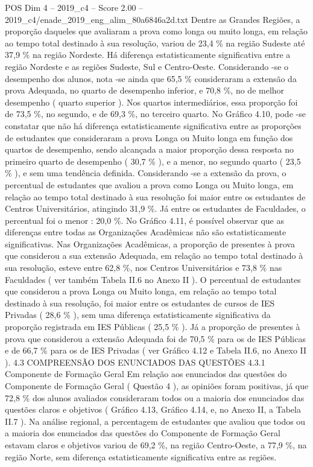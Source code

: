 \begin{textsample}{POS Dim 4 – 2019\_c4 – Score 2.00 – 2019\_c4/enade\_2019\_eng\_alim\_80a6846a2d.txt}
Dentre as Grandes Regiões, a proporção daqueles que avaliaram a prova como longa ou muito longa, em relação ao tempo total destinado à sua resolução, variou de 23,4 \% na região Sudeste até 37,9 \% na região Nordeste.
Há diferença estatisticamente significativa entre a região Nordeste e as regiões Sudeste, Sul e Centro-Oeste.
Considerando -se o desempenho dos alunos, nota -se ainda que 65,5 \% consideraram a extensão da prova Adequada, no quarto de desempenho inferior, e 70,8 \%, no de melhor desempenho ( quarto superior ).
Nos quartos intermediários, essa proporção foi de 73,5 \%, no segundo, e de 69,3 \%, no terceiro quarto.
No Gráfico 4.10, pode -se constatar que não há diferença estatisticamente significativa entre as proporções de estudantes que consideraram a prova Longa ou Muito longa em função dos quartos de desempenho, sendo alcançada a maior proporção dessa resposta no primeiro quarto de desempenho ( 30,7 \% ), e a menor, no segundo quarto ( 23,5 \% ), e sem uma tendência definida.
Considerando -se a extensão da prova, o percentual de estudantes que avaliou a prova como Longa ou Muito longa, em relação ao tempo total destinado à sua resolução foi maior entre os estudantes de Centros Universitários, atingindo 31,9 \%.
Já entre os estudantes de Faculdades, o percentual foi o menor : 20,0 \%.
No Gráfico 4.11, é possível observar que as diferenças entre todas as Organizações Acadêmicas não são estatisticamente significativas.
Nas Organizações Acadêmicas, a proporção de presentes à prova que considerou a sua extensão Adequada, em relação ao tempo total destinado à sua resolução, esteve entre 62,8 \%, nos Centros Universitários e 73,8 \% nas Faculdades ( ver também Tabela II.6 no Anexo II ).
O percentual de estudantes que considerou a prova Longa ou Muito longa, em relação ao tempo total destinado à sua resolução, foi maior entre os estudantes de cursos de IES Privadas ( 28,6 \% ), sem uma diferença estatisticamente significativa da proporção registrada em IES Públicas ( 25,5 \% ).
Já a proporção de presentes à prova que considerou a extensão Adequada foi de 70,5 \% para os de IES Públicas e de 66,7 \% para os de IES Privadas ( ver Gráfico 4.12 e Tabela II.6, no Anexo II ). 4.3 COMPREENSÃO DOS ENUNCIADOS DAS QUESTÕES 4.3.1 Componente de Formação Geral Em relação aos enunciados das questões do Componente de Formação Geral ( Questão 4 ), as opiniões foram positivas, já que 72,8 \% dos alunos avaliados consideraram todos ou a maioria dos enunciados das questões claros e objetivos ( Gráfico 4.13, Gráfico 4.14, e, no Anexo II, a Tabela II.7 ).
Na análise regional, a percentagem de estudantes que avaliou que todos ou a maioria dos enunciados das questões do Componente de Formação Geral estavam claros e objetivos variou de 69,2 \%, na região Centro-Oeste, a 77,9 \%, na região Norte, sem diferença estatisticamente significativa entre as regiões.

\end{textsample}
